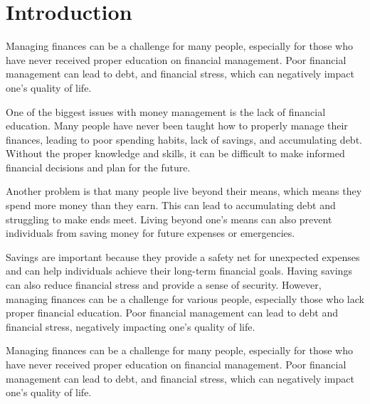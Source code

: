 
\chapter{Introduction}\label{cap:intro}


\hspace{\parindent}Managing finances can be a challenge for many people, especially for those who have never received proper education on financial management. Poor financial management can lead to debt, and financial stress, which can negatively impact one's quality of life.

\hspace{\parindent}One of the biggest issues with money management is the lack of financial education. Many people have never been taught how to properly manage their finances, leading to poor spending habits, lack of savings, and accumulating debt. Without the proper knowledge and skills, it can be difficult to make informed financial decisions and plan for the future.

\hspace{\parindent}Another problem is that many people live beyond their means, which means they spend more money than they earn. This can lead to accumulating debt and struggling to make ends meet. Living beyond one's means can also prevent individuals from saving money for future expenses or emergencies.

\hspace{\parindent}Savings are important because they provide a safety net for unexpected expenses and can help individuals achieve their long-term financial goals. Having savings can also reduce financial stress and provide a sense of security. However, managing finances can be a challenge for various people, especially those who lack proper financial education. Poor financial management can lead to debt and financial stress, negatively impacting one’s quality of life.

\hspace{\parindent}Managing finances can be a challenge for many people, especially for those who have never received proper education on financial management. Poor financial management can lead to debt, and financial stress, which can negatively impact one's quality of life.

